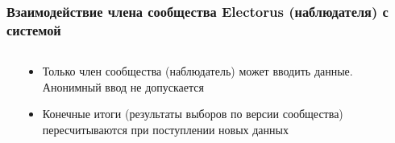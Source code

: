 \documentclass[compress,hyperref={linkcolor=blue,pdftex,unicode}]{beamer}
\begin{document}
\begin{frame}
\frametitle{Взаимодействие члена сообщества Electorus (наблюдателя) с системой}
\begin{columns}
\begin{column}{.5\textwidth}
\end{column}
\begin{column}{.5\textwidth}
\begin{itemize}
\item Только член сообщества (наблюдатель) может вводить данные. Анонимный ввод не допускается
\item Конечные итоги (результаты выборов по версии сообщества) пересчитываются при поступлении новых данных
\end{itemize}
\end{column}
\end{columns}
\end{frame}
\end{document}
